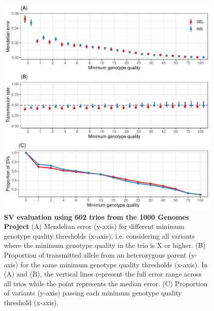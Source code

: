 \documentclass[11pt]{ucscthesis}
\begin{document}
\begin{figure}[H]
  \includegraphics[width=\linewidth]{fig-sv-trio-eval.pdf}
  \caption[SV evaluation using 602 trios from the 1000 Genomes Project]{{\bf SV evaluation using 602 trios from the 1000 Genomes Project}
    (A) Mendelian error (y-axis) for different minimum genotype quality thresholds (x-axis), i.e. considering all variants where the minimum genotype quality in the trio is X or higher.
    (B) Proportion of transmitted allele from an heterozygous parent (y-axis) for the same minimum genotype quality thresholds (x-axis).
    In (A) and (B), the vertical lines represent the full error range across all trios while the point represents the median error.
    (C) Proportion of variants (y-axis) passing each minimum genotype quality threshold (x-axis).
  }
  \label{fig:sv-trio-eval}
\end{figure}
\end{document}
